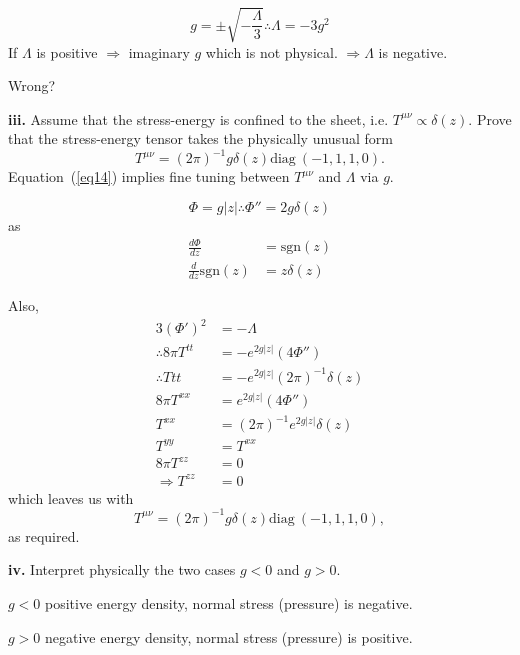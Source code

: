 \documentclass[a4paper]{article} %
\newcommand{\diag}{\text{diag}~}
\begin{document}
\begin{equation}
g=\pm \sqrt{-\frac{\Lambda}{3}} \therefore \Lambda = -3g^2
\end{equation}
If $\Lambda$ is positive $\Rightarrow$ imaginary $g$ which is not physical. $\Rightarrow \Lambda$ is negative.

{\huge Wrong?}

\begin{framed}
\textbf{iii.} Assume that the stress-energy is confined to the sheet, i.e. $T^{\mu\nu}\propto \delta(z)$. Prove that the stress-energy tensor takes the physically unusual form
\begin{equation}
T^{\mu\nu}=(2\pi)^{-1}g\delta(z)\diag(-1,1,1,0).\label{eq14}
\end{equation}
Equation~(\ref{eq14}) implies fine tuning between $T^{\mu\nu}$ and $\Lambda$ via $g$.
\end{framed}

\begin{equation}
\Phi = g|z| \therefore \Phi''= 2g\delta(z)
\end{equation}
as 
\begin{align}
\frac{d\Phi}{dz}&=\text{sgn}(z)\\
\frac{d}{dz}\text{sgn}(z)&=z\delta(z)
\end{align}

Also, 
\begin{align}
3(\Phi')^2&=-\Lambda\\
\therefore 8\pi T^{tt}&=-e^{2g|z|}(4\Phi'')\\
\therefore T{tt}&= -e^{2g|z|} (2\pi)^{-1} \delta(z)\\
8\pi T^{xx}&= e^{2g|z|}(4\Phi'')\\
T^{xx}&=(2\pi)^{-1}e^{2g|z|} \delta(z)\\
T^{yy}&=T^{xx}\\
8\pi T^{zz}&=0\\
\Rightarrow T^{zz}&=0
\end{align}
which leaves us with
\begin{equation}
T^{\mu\nu}=(2\pi)^{-1}g\delta(z)\diag(-1,1,1,0),
\end{equation}
as required.


\begin{framed}
\textbf{iv.} Interpret physically the two cases $g < 0$ and $g > 0$.
\end{framed}

$g<0$ positive energy density, normal stress (pressure) is negative.

$g>0$ negative energy density, normal stress (pressure) is positive.
\end{document}
